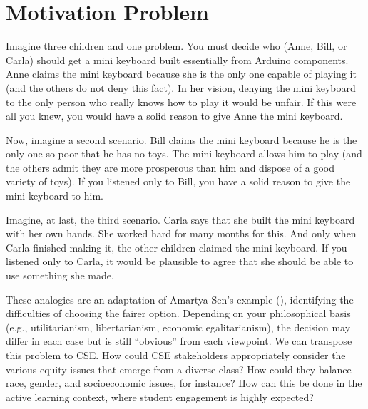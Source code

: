 \section{Motivation Problem}
\label{intro-sec:mot-prob}

Imagine three children and one problem. You must decide who (Anne, Bill, or Carla) should get a mini keyboard built essentially from Arduino components. Anne claims the mini keyboard because she is the only one capable of playing it (and the others do not deny this fact). In her vision, denying the mini keyboard to the only person who really knows how to play it would be unfair. If this were all you knew, you would have a solid reason to give Anne the mini keyboard. 

Now, imagine a second scenario. Bill claims the mini keyboard because he is the only one so poor that he has no toys. The mini keyboard allows him to play (and the others admit they are more prosperous than him and dispose of a good variety of toys). If you listened only to Bill, you have a solid reason to give the mini keyboard to him. 

Imagine, at last, the third scenario. Carla says that she built the mini keyboard with her own hands. She worked hard for many months for this. And only when Carla finished making it, the other children claimed the mini keyboard. If you listened only to Carla, it would be plausible to agree that she should be able to use something she made.

These analogies are an adaptation of Amartya Sen’s example (\citeyear{sen:2009}), identifying the difficulties of choosing the fairer option. Depending on your philosophical basis (e.g., utilitarianism, libertarianism, economic egalitarianism), the decision may differ in each case but is still ``obvious'' from each viewpoint. We can transpose this problem to \gls{CSE}. How could \gls{CSE} stakeholders appropriately consider the various equity issues that emerge from a diverse class? How could they balance race, gender, and socioeconomic issues, for instance? How can this be done in the active learning context, where student engagement is highly expected?